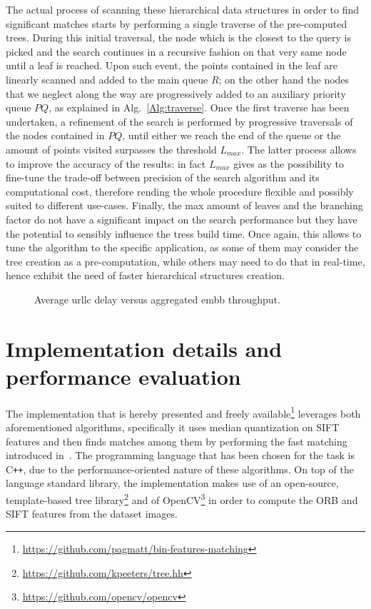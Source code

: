 \documentclass[a4paper, 11pt, oneside]{article}
\newlength\fheight
\newlength\fwidth
\begin{document}
The actual process of scanning these hierarchical data structures in order to find significant matches starts by performing a single traverse of the pre-computed trees. During this initial traversal, the node which is the closest to the query is picked and the search continues in a recursive fashion on that very same node until a leaf is reached. Upon such event, the points contained in the leaf are linearly scanned and added to the main queue $R$; on the other hand the nodes that we neglect along the way are progressively added to an auxiliary priority queue $PQ$, as explained in Alg.~\ref{Alg:traverse}. Once the first traverse has been undertaken, a refinement of the search is performed by progressive traversals of the nodes contained in $PQ$, until either we reach the end of the queue or the amount of points visited surpasses the threshold $L_{max}$. The latter process allows to improve the accuracy of the results: in fact $L_{max}$ gives as the possibility to fine-tune the trade-off between precision of the search algorithm and its computational cost, therefore rending the whole procedure flexible and possibly suited to different use-cases. Finally, the max amount of leaves and the branching factor do not have a significant impact on the search performance but they have the potential to sensibly influence the tress build time. Once again, this allows to tune the algorithm to the specific application, as some of them may consider the tree creation as a pre-computation, while others may need to do that in real-time, hence exhibit the need of faster hierarchical structures creation.

    
\begin{figure}[h!]
  \centering
    \setlength{}
    \setlength{}
    
    \setlength\belowcaptionskip{-.3cm}
    \caption{Average \gls{urllc} delay versus aggregated \gls{embb} throughput.}
    \label{Fig:perf_cost}
\end{figure}    

\section*{Implementation details and performance evaluation} 
The implementation that is hereby presented and freely available\footnote{\url{https://github.com/pagmatt/bin-features-matching}} leverages both aforementioned algorithms, specifically it uses median quantization on SIFT features and then finds matches among them by performing the fast matching introduced in~\cite{muja2012fast}. The programming language that has been chosen for the task is C\texttt{++}, due to the performance-oriented nature of these algorithms. On top of the language standard library, the implementation makes use of an open-source, template-based tree library\footnote{\url{https://github.com/kpeeters/tree.hh}} and of OpenCV\footnote{\url{https://github.com/opencv/opencv}} in order to compute the ORB and SIFT features from the dataset images.
\end{document}
